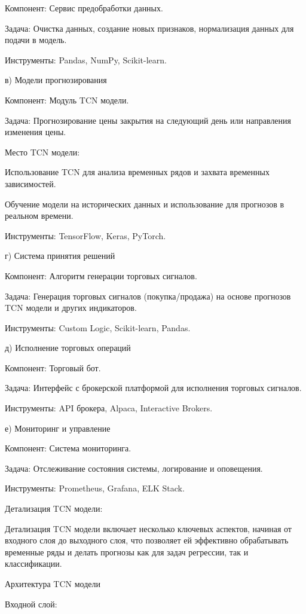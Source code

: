 Компонент: Сервис предобработки данных.

Задача: Очистка данных, создание новых признаков, нормализация данных для подачи в модель.

Инструменты\foreignlanguage{english}{: Pandas, NumPy, Scikit-learn.}

в) Модели прогнозирования

Компонент: Модуль TCN модели.

Задача: Прогнозирование цены закрытия на следующий день или направления изменения цены.

Место TCN модели:

Использование TCN для анализа временных рядов и захвата временных зависимостей.

Обучение модели на исторических данных и использование для прогнозов в реальном времени.

Инструменты: TensorFlow, Keras, PyTorch.

г) Система принятия решений

Компонент: Алгоритм генерации торговых сигналов.

Задача: Генерация торговых сигналов (покупка/продажа) на основе прогнозов TCN модели и других индикаторов.

Инструменты\foreignlanguage{english}{: Custom Logic, Scikit-learn, Pandas.}

д) Исполнение торговых операций

Компонент: Торговый бот.

Задача: Интерфейс с брокерской платформой для исполнения торговых сигналов.

Инструменты\foreignlanguage{english}{: API }брокера\foreignlanguage{english}{, Alpaca, Interactive Brokers.}

е) Мониторинг и управление

Компонент: Система мониторинга.

Задача: Отслеживание состояния системы, логирование и оповещения.

Инструменты\foreignlanguage{english}{: Prometheus, Grafana, ELK Stack.}

Детализация TCN модели:

Детализация TCN модели включает несколько ключевых аспектов, начиная от входного слоя до выходного слоя, что позволяет ей эффективно обрабатывать временные ряды и делать прогнозы как для задач регрессии, так и классификации.

Архитектура TCN модели

Входной слой:

